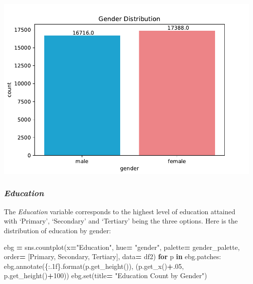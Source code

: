 \documentclass[water,article,submit,moreauthors,pdftex]{mdpi}
\newenvironment{Shaded}{\begin{snugshade}}{\end{snugshade}}
\newcommand{\BuiltInTok}[1]{#1}
\newcommand{\ControlFlowTok}[1]{\textcolor[rgb]{0.13,0.29,0.53}{\textbf{#1}}}
\newcommand{\DecValTok}[1]{\textcolor[rgb]{0.00,0.00,0.81}{#1}}
\newcommand{\FloatTok}[1]{\textcolor[rgb]{0.00,0.00,0.81}{#1}}
\newcommand{\KeywordTok}[1]{\textcolor[rgb]{0.13,0.29,0.53}{\textbf{#1}}}
\newcommand{\NormalTok}[1]{#1}
\newcommand{\OperatorTok}[1]{\textcolor[rgb]{0.81,0.36,0.00}{\textbf{#1}}}
\newcommand{\SpecialCharTok}[1]{\textcolor[rgb]{0.00,0.00,0.00}{#1}}
\newcommand{\StringTok}[1]{\textcolor[rgb]{0.31,0.60,0.02}{#1}}
\begin{document}
\includegraphics{term_paper_files/figure-latex/unnamed-chunk-6-1.pdf}

\hypertarget{education}{%
\subsubsection{\texorpdfstring{\emph{Education}}{Education}}\label{education}}

The \emph{Education} variable corresponds to the highest level of
education attained with `Primary', `Secondary' and `Tertiary' being the
three options. Here is the distribution of education by gender:

\begin{Shaded}
\begin{Highlighting}[]
\NormalTok{ebg }\OperatorTok{=}\NormalTok{ sns.countplot(x}\OperatorTok{=}\StringTok{"Education"}\NormalTok{, hue}\OperatorTok{=} \StringTok{"gender"}\NormalTok{, palette}\OperatorTok{=}\NormalTok{ gender\_palette, order}\OperatorTok{=}\NormalTok{ [}\StringTok{\textquotesingle{}Primary\textquotesingle{}}\NormalTok{, }\StringTok{\textquotesingle{}Secondary\textquotesingle{}}\NormalTok{, }\StringTok{\textquotesingle{}Tertiary\textquotesingle{}}\NormalTok{], data}\OperatorTok{=}\NormalTok{ df2)}
\ControlFlowTok{for}\NormalTok{ p }\KeywordTok{in}\NormalTok{ ebg.patches:}
\NormalTok{   ebg.annotate(}\StringTok{\textquotesingle{}}\SpecialCharTok{\{:.1f\}}\StringTok{\textquotesingle{}}\NormalTok{.}\BuiltInTok{format}\NormalTok{(p.get\_height()), (p.get\_x()}\OperatorTok{+}\FloatTok{.05}\NormalTok{, p.get\_height()}\OperatorTok{+}\DecValTok{100}\NormalTok{))}
\NormalTok{ebg.}\BuiltInTok{set}\NormalTok{(title}\OperatorTok{=} \StringTok{"Education Count by Gender"}\NormalTok{)}
\end{Highlighting}
\end{Shaded}
\end{document}
